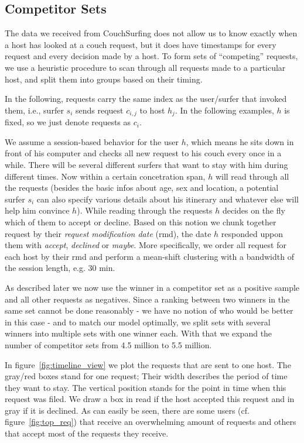\subsection{Competitor Sets} \label{subsec:competitor_sets}

The data we received from CouchSurfing does not allow us to know exactly when a host has looked at a couch request, but it does have timestamps for every request and every decision made by a host.
To form sets of ``competing'' requests, we use a heuristic procedure to scan through all requests made to a particular host, and split them into groups based on their timing.

In the following, requests carry the same index as the user/surfer that invoked them, i.e., surfer $s_i$ sends request $c_{i,j}$ to host $h_j$.
In the following examples, $h$ is fixed, so we just denote requests as $c_i$.

We assume a session-based behavior for the user $h$, which means he sits down in front of his computer and checks all new request to his couch every once in a while. There will be several different surfers that want to stay with him during different times. Now within a certain concetration span, $h$ will read through all the requests (besides the basic infos about age, sex and location, a potential surfer $s_i$ can also specify various details about his itinerary and whatever else will help him convince $h$). While reading through the requests $h$ decides on the fly which of them to accept or decline. Based on this notion we chunk together request by their \textit{request modification date} (rmd), the date $h$ responded uppon them with \textit{accept}, \textit{declined} or \textit{maybe}. More specifically, we order all request for each host by their rmd and perform a mean-shift clustering with a bandwidth of the session length, e.g. 30 min. 

As described later we now use the winner in a competitor set as a positive sample and all other requests as negatives. Since a ranking between two winners in the same set cannot be done reasonably - we have no notion of who would be better in this case - and to match our model optimally, we split sets with several winners into multiple sets with one winner each. With that we expand the number of competitor sets from 4.5 million to 5.5 million.

In figure~\ref{fig:timeline_view} we plot the requests that are sent to one host. The gray/red boxes stand for one request; Their width describes the period of time they want to stay. The vertical position stands for the point in time when this request was filed. We draw a box in read if the host accepted this request and in gray if it is declined. As can easily be seen, there are some users (cf. figure~\ref{fig:top_req}) that receive an overwhelming amount of requests and others that accept most of the requests they receive.

